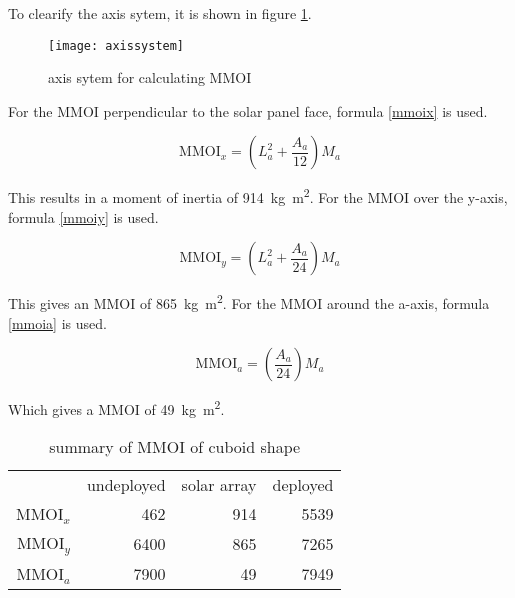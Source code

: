 To clearify the axis sytem, it is shown in figure
\ref{axissystemcuboid}.

\begin{figure}[H]
  \centering
  \texttt{[image: axissystem]}
  \caption{axis sytem for calculating MMOI}
  \label{axissystemcuboid}
\end{figure}

For the MMOI perpendicular to the solar panel face, formula
\ref{mmoix} is used.

\begin{equation}
  \label{mmoix}
  \mathrm{MMOI}_x=\left(L_a^2+\frac{A_a}{12}\right)M_a
\end{equation}

This results in a moment of inertia of \SI{914}{kg.m^2}.  For the MMOI
over the y-axis, formula \ref{mmoiy} is used.

\begin{equation}
  \label{mmoiy}
  \mathrm{MMOI}_y=\left(L_a^2+\frac{A_a}{24}\right)M_a
\end{equation}

This gives an MMOI of \SI{865}{kg.m^2}.  For the MMOI around the
a-axis, formula \ref{mmoia} is used.

\begin{equation}
  \label{mmoia}
  \mathrm{MMOI}_a=\left(\frac{A_a}{24}\right)M_a
\end{equation}

Which gives a MMOI of \SI{49}{kg.m^2}.

\begin{longtable}{rrrr}
\caption{summary of MMOI of cuboid shape} \\
 & undeployed & solar array & deployed \\
 MMOI$_x$ & 462 & 914 & 5539 \\
 MMOI$_y$ & 6400 & 865 & 7265 \\
 MMOI$_a$ & 7900 & 49 & 7949 \\
\end{longtable}

